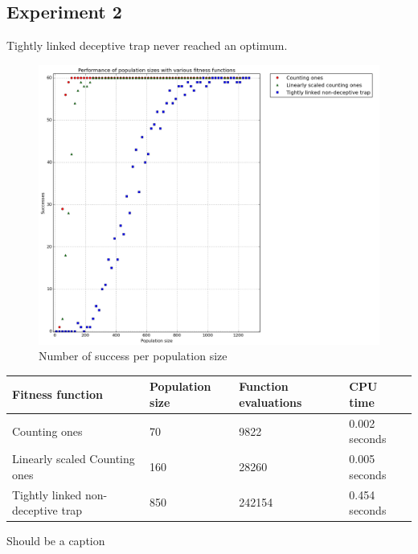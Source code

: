 \documentclass[12pt]{article}
\theoremstyle{definition}
\begin{document}
\subsection*{Experiment 2}
Tightly linked deceptive trap never reached an optimum.

\begin{figure}[H]
    \centering
    \includegraphics[totalheight=0.7\textheight]{images/exp2.png}
    \caption{Number of success per population size}
\label{fig:exp2}
\end{figure}

\begin{adjustwidth}{-1cm}{}
\begin{minipage}{\linewidth}
\centering
{}
\label{tab:title}
\begin{tabular}{llll}
\toprule[1.5pt]
\bf Fitness function & \bf Population size & \bf Function evaluations & \bf CPU time\\\midrule
Counting ones & 70 & 9822 & 0.002 seconds \\
Linearly scaled Counting ones & 160 & 28260 & 0.005 seconds \\
Tightly linked non-deceptive trap & 850 & 242154 & 0.454 seconds \\
\bottomrule[1.25pt]
\end{tabular}\par
\bigskip
Should be a caption
\end{minipage}
\end{adjustwidth}
\end{document}
